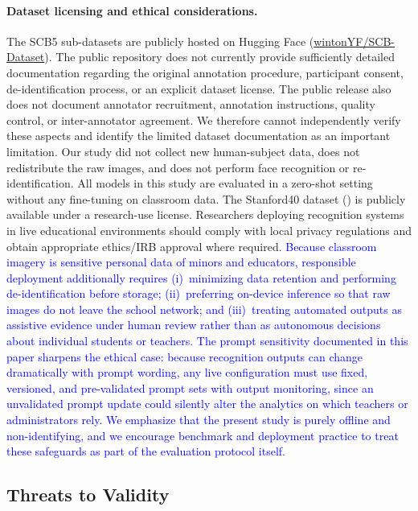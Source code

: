 \documentclass[symmetry,article,submit,pdftex,moreauthors]{Definitions/mdpi}
\newcommand{\rev}[1]{\textcolor{blue}{#1}}
\begin{document}
\paragraph{Dataset licensing and ethical considerations.}
The SCB5 sub-datasets are publicly hosted on Hugging Face (\href{https://huggingface.co/datasets/wintonYF/SCB-Dataset}{wintonYF/SCB-Dataset}). The public repository does not currently provide sufficiently detailed documentation regarding the original annotation procedure, participant consent, de-identification process, or an explicit dataset license. The public release also does not document annotator recruitment, annotation instructions, quality control, or inter-annotator agreement. We therefore cannot independently verify these aspects and identify the limited dataset documentation as an important limitation. Our study did not collect new human-subject data, does not redistribute the raw images, and does not perform face recognition or re-identification. All models in this study are evaluated in a zero-shot setting without any fine-tuning on classroom data. The Stanford40 dataset () is publicly available under a research-use license. Researchers deploying recognition systems in live educational environments should comply with local privacy regulations and obtain appropriate ethics/IRB approval where required. \rev{Because classroom imagery is sensitive personal data of minors and educators, responsible deployment additionally requires (i)~minimizing data retention and performing de-identification before storage; (ii)~preferring on-device inference so that raw images do not leave the school network; and (iii)~treating automated outputs as assistive evidence under human review rather than as autonomous decisions about individual students or teachers. The prompt sensitivity documented in this paper sharpens the ethical case: because recognition outputs can change dramatically with prompt wording, any live configuration must use fixed, versioned, and pre-validated prompt sets with output monitoring, since an unvalidated prompt update could silently alter the analytics on which teachers or administrators rely. We emphasize that the present study is purely offline and non-identifying, and we encourage benchmark and deployment practice to treat these safeguards as part of the evaluation protocol itself.}

\subsection{Threats to Validity}
\label{sec:threats_validity}
\end{document}
